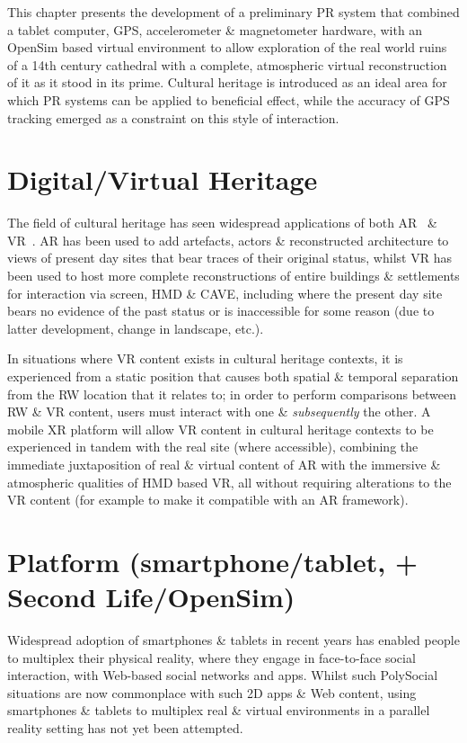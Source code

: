 This chapter presents the development of a preliminary PR system that combined a tablet computer, GPS, accelerometer \& magnetometer hardware, with an OpenSim based virtual environment to allow exploration of the real world ruins of a 14th century cathedral with a complete, atmospheric virtual reconstruction of it as it stood in its prime. Cultural heritage is introduced as an ideal area for which PR systems can be applied to beneficial effect, while the accuracy of GPS tracking emerged as a constraint on this style of interaction.

\section{Digital/Virtual Heritage}
The field of cultural heritage has seen widespread applications of both AR~\cite{Kim2009, Wojciechowski2004, Okura2006, Magnenat-Thalmann2008a, vlahakis:archeoguide, Okura2011, Seo2010, benko:collaborative, Papagiannakis2004, Magnenat-Thalmann7, Papagiannakis2005, Papagiannakis2007, Papagiannakis2009, Taketomi2011, walczak:applications} \& VR~\cite{deamicis:gamebased, roussou:photorealism, cabral:x3dexperience, Roussou2002, Christou2006, willmott:largecomplex, Tzortzaki2002}. AR has been used to add artefacts, actors \& reconstructed architecture to views of present day sites that bear traces of their original status, whilst VR has been used to host more complete reconstructions of entire buildings \& settlements for interaction via screen, HMD \& CAVE, including where the present day site bears no evidence of the past status or is inaccessible for some reason (due to latter development, change in landscape, etc.).

In situations where VR content exists in cultural heritage contexts, it is experienced from a static position that causes both spatial \& temporal separation from the RW location that it relates to; in order to perform comparisons between RW \& VR content, users must interact with one \& \textit{subsequently} the other. A mobile XR platform will allow VR content in cultural heritage contexts to be experienced in tandem with the real site (where accessible), combining the immediate juxtaposition of real \& virtual content of AR with the immersive \& atmospheric qualities of HMD based VR, all without requiring alterations to the VR content (for example to make it compatible with an AR framework).


\section{Platform (smartphone/tablet, + Second Life/OpenSim)}
Widespread adoption of smartphones \& tablets in recent years has enabled people to multiplex their physical reality, where they engage in face-to-face social interaction, with Web-based social networks and apps\cite{Accenture2012}. Whilst such PolySocial situations are now commonplace with such 2D apps \& Web content, using smartphones \& tablets to multiplex real \& virtual environments in a parallel reality setting has not yet been attempted.

